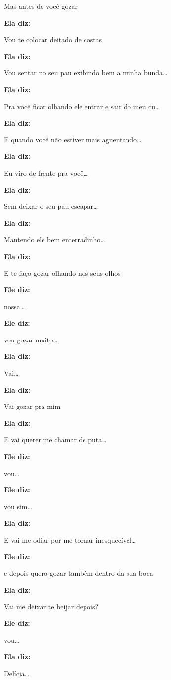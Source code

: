 Mas antes de você gozar

\textbf{Ela diz:}

Vou te colocar deitado de costas

\textbf{Ela diz:}

Vou sentar no seu pau exibindo bem a minha bunda…

\textbf{Ela diz:}

Pra você ficar olhando ele entrar e sair do meu cu…

\textbf{Ela diz:}

E quando você não estiver mais aguentando…

\textbf{Ela diz:}

Eu viro de frente pra você…

\textbf{Ela diz:}

Sem deixar o seu pau escapar…

\textbf{Ela diz:}

Mantendo ele bem enterradinho…

\textbf{Ela diz:}

E te faço gozar olhando nos seus olhos

\textbf{Ele diz:}

nossa…

\textbf{Ele diz:}

vou gozar muito…

\textbf{Ela diz:}

Vai…

\textbf{Ela diz:}

Vai gozar pra mim

\textbf{Ela diz:}

E vai querer me chamar de puta…

\textbf{Ele diz:}

vou…

\textbf{Ele diz:}

vou sim…

\textbf{Ela diz:}

E vai me odiar por me tornar inesquecível…

\textbf{Ele diz:}

e depois quero gozar também dentro da sua boca

\textbf{Ela diz:}

Vai me deixar te beijar depois?

\textbf{Ele diz:}

vou…

\textbf{Ela diz:}

Delícia…

